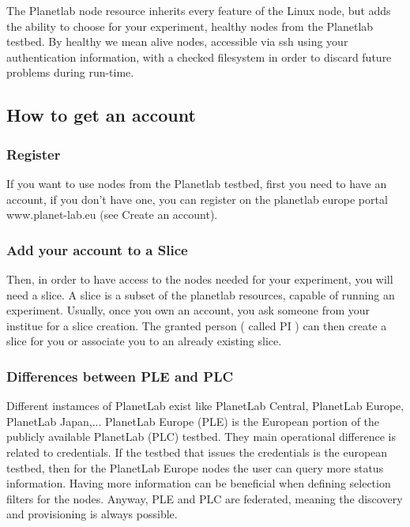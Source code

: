 The Planetlab node resource inherits every feature of the Linux node, but adds the ability to choose for your experiment, healthy nodes from the Planetlab testbed. By healthy we mean alive nodes, accessible via ssh using your authentication information, with a checked filesystem in order to discard future problems during run-time.

\subsection{How to get an account}

  \subsubsection{Register}

If you want to use nodes from the Planetlab testbed, first you need to have an account, if you don't have one, you can register on the planetlab europe portal www.planet-lab.eu (see Create an account). 

  \subsubsection{Add your account to a Slice}

Then, in order to have access to the nodes needed for your experiment, you will need a slice. A slice is a subset of the planetlab resources, capable of running an experiment. Usually, once you own an account, you ask someone from your institue for a slice creation. The granted person ( called PI ) can then create a slice for you or associate you to an already existing slice.

  \subsubsection{Differences between PLE and PLC}

Different instamces of PlanetLab exist like PlanetLab Central, PlanetLab Europe, PlanetLab Japan,...  PlanetLab Europe (PLE) is the European portion of the publicly available PlanetLab (PLC) testbed. They main operational difference is related to credentials. If the testbed that issues the credentials is the european testbed, then for the PlanetLab Europe nodes the user can query more status information. Having more information can be beneficial when defining selection filters for the nodes. Anyway, PLE and PLC are federated, meaning the discovery and provisioning is always possible.

